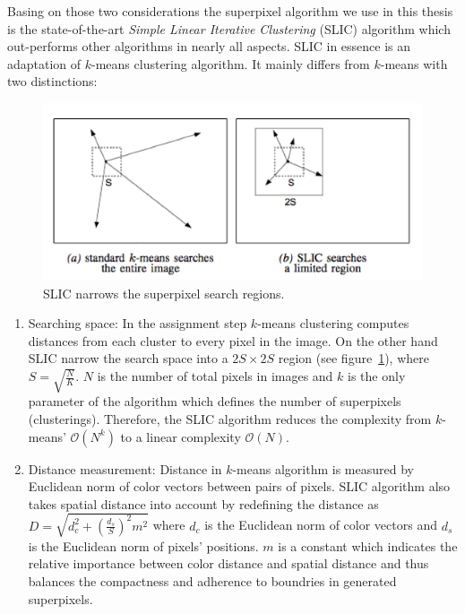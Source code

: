 Basing on those two considerations the superpixel algorithm we use
in this thesis is the state-of-the-art \emph{Simple Linear
  Iterative Clustering} (SLIC) algorithm which out-performs other
algorithms in nearly all aspects\cite{achanta2012slic}. SLIC in
essence is an adaptation of $k$-means clustering algorithm. It
mainly differs from $k$-means with two
distinctions\cite{achanta2012slic}:

\begin{figure}[h]
    \centering
    \includegraphics[width=0.8\linewidth]{RelatedWorks/figures/SLIC_AssignStep.png}
    \caption{\label{fig:SLIC_Regions}SLIC narrows the superpixel
      search regions.}
\end{figure}

\begin{enumerate}
\item Searching space: In the assignment step $k$-means
  clustering computes distances from each cluster to every pixel
  in the image. On the other hand SLIC narrow the search space
  into a $2S\times 2S$ region (see figure~\ref{fig:SLIC_Regions}), where $S=\sqrt{\frac{N}{K}}$. $N$
  is the number of total pixels in images and $k$ is the only
  parameter of the algorithm which defines the number of
  superpixels (clusterings). Therefore, the SLIC algorithm
  reduces the complexity from $k$-means' $\mathcal{O}(N^k)$ to a
  linear complexity $\mathcal{O}(N)$.

\item Distance measurement: Distance in $k$-means algorithm is
  measured by Euclidean norm of color vectors between pairs of
  pixels. SLIC algorithm also takes spatial distance into account
  by redefining the distance as $D =
  \sqrt{d_c^2+(\frac{d_s}{S})^2m^2}$ where $d_c$ is the Euclidean
  norm of color vectors and $d_s$ is the Euclidean norm of pixels'
  positions. $m$ is a constant which indicates the relative
  importance between color distance and spatial distance and thus
  balances the compactness and adherence to boundries in
  generated superpixels.
\end{enumerate}


